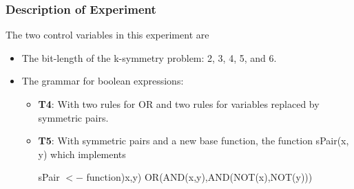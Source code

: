 \begin{frame}
\frametitle{
Description of Experiment
}
The two control variables in this experiment are
\begin{itemize}
\item The bit-length of the k-symmetry problem: 2, 3, 4, 5, and 6.
\item The grammar for boolean expressions:
\begin{itemize} 
\item {\bf T4}: With two rules for OR and two rules for variables replaced
            by symmetric pairs.
\item {\bf T5}: With symmetric pairs and a new base function,
       the function sPair(x, y) which implements
 
sPair $<-$ function)x,y) {OR(AND(x,y),AND(NOT(x),NOT(y)))}
\end{itemize}
\end{itemize}
\end{frame}